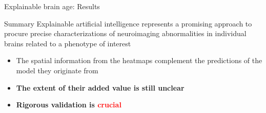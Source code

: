 \begin{frame}{Explainable brain age: Results}
\end{frame}

\begin{frame}{Summary}
    Explainable artificial intelligence represents a promising approach to procure precise characterizations of neuroimaging abnormalities in individual brains related to a phenotype of interest
    \begin{itemize}
        \item The spatial information from the heatmaps complement the predictions of the model they originate from
        \item \textbf{The extent of their added value is still unclear}
        \item \textbf{Rigorous validation is \textcolor{red}{crucial}}
    \end{itemize}
\end{frame}
